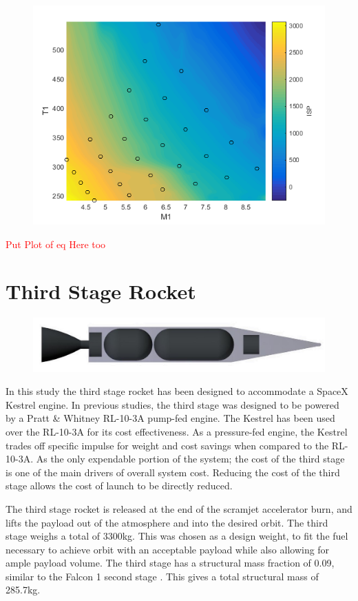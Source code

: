 	
	
	\begin{figure}
\centering
\includegraphics[width=0.7\linewidth]{figures/3_vehicle_design/ISPinterp}
\caption{}
\label{fig:ISPinterp}
\end{figure}

	
	\textcolor{red}{Put Plot of eq Here too}
	\section{Third Stage Rocket}
	
	\begin{figure}
\centering
\includegraphics[width=0.7\linewidth]{figures/3_vehicle_design/3rdStage}
\caption{}
\label{fig:3rdStage}
\end{figure}
	
	In this study the third stage rocket has been designed to accommodate a SpaceX Kestrel engine. In previous studies, the third stage was designed to be powered by a Pratt \& Whitney RL-10-3A pump-fed engine. The Kestrel has been used over the RL-10-3A for its cost effectiveness. As a pressure-fed engine, the Kestrel trades off specific impulse for weight and cost savings when compared to the RL-10-3A. As the only expendable portion of the system; the cost of the third stage is one of the main drivers of overall system cost. Reducing the cost of the third stage allows the cost of launch to be directly reduced. 
	
	The third stage rocket is released at the end of the scramjet accelerator burn, and lifts the payload out of the atmosphere and into the desired orbit. The third stage weighs a total of 3300kg. This was chosen as a design weight, to fit the fuel necessary to achieve orbit with an acceptable payload while also allowing for ample payload volume. The third stage has a structural mass fraction of 0.09, similar to the Falcon 1 second stage \cite{Vehicle2008}. This gives a total structural mass of 285.7kg. 
	
